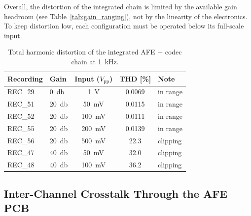 Overall, the distortion of the integrated chain is limited by the available gain headroom (see Table~\ref{tab:gain_ranging}), not by the linearity of the electronics. To keep distortion low, each configuration must be operated below its full-scale input.

\begin{table}[h!]
\centering
\begin{tabular}{llccl}
\hline
\textbf{Recording} & \textbf{Gain} & \textbf{Input ($V_{\text{pp}}$)} & \textbf{THD [\%]} & \textbf{Note} \\
\hline
REC\_29 & \SI{0}{\decibel}  & \SI{1}{\volt}      & 0.0069 & in range \\
REC\_51 & \SI{20}{\decibel} & \SI{50}{\milli\volt}  & 0.0115 & in range \\
REC\_52 & \SI{20}{\decibel} & \SI{100}{\milli\volt} & 0.0111 & in range \\
REC\_55 & \SI{20}{\decibel} & \SI{200}{\milli\volt} & 0.0139 & in range \\
REC\_56 & \SI{20}{\decibel} & \SI{500}{\milli\volt} & 22.3   & clipping \\
REC\_47 & \SI{40}{\decibel} & \SI{50}{\milli\volt}  & 32.0   & clipping \\
REC\_48 & \SI{40}{\decibel} & \SI{100}{\milli\volt} & 36.2   & clipping \\
\hline
\end{tabular}
\caption{Total harmonic distortion of the integrated AFE + codec chain at \SI{1}{\kilo\hertz}.}
\label{tab:res_int_thd}
\end{table}

\subsection{Inter-Channel Crosstalk Through the AFE PCB}
\label{sec:res_int_crosstalk}

